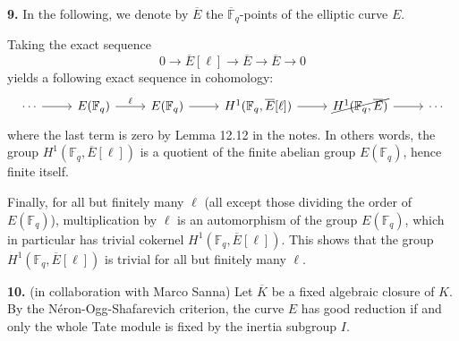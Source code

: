 \documentclass[a4paper]{article}
\newcommand{\Fq}{\mathbb{F}_q}
\newcommand{\Fqq}{\overline{\mathbb{F}}_q}
\newcommand{\E}{\overline{E}}
\theoremstyle{definition}
\theoremstyle{definition}
\theoremstyle{remark}
\theoremstyle{definition}
\begin{document}
\textbf{9.} In the following, we denote by $\E$ the $\Fqq$-points of the elliptic curve $E$.

\noindent Taking the exact sequence
\begin{equation*}
        0 \to \E[\ell] \to \E \to \E \to 0
\end{equation*}
yields a following exact sequence in cohomology:
\[
        \begin{tikzcd}
                \cdots \ar[r] & E(\Fq) \ar[r, "\ell"] &E(\Fq) \ar[r] &H^1(\Fq, \E[\ell]) \ar[r] &\cancel{H^1(\Fq, \E)} \ar[r] &\cdots
        \end{tikzcd}
\]
where the last term is zero by Lemma 12.12 in the notes. In others words, the group $H^1(\Fq, \E[\ell])$ is a quotient of the finite abelian group $E(\Fq)$, hence finite itself.

Finally, for all but finitely many $\ell$ (all except those dividing the order of $E(\Fq)$), multiplication by $\ell$ is an automorphism of the group $E(\Fq)$, which in particular has trivial cokernel $H^1(\Fq, \E[\ell])$. This shows that the group $H^1(\Fq, \E[\ell])$ is trivial for all but finitely many $\ell$.

\textbf{10.} (in collaboration with Marco Sanna)
\noindent Let $\overline{K}$ be a fixed algebraic closure of $K$. By the N\'eron-Ogg-Shafarevich criterion, the curve $E$ has good reduction if and only the whole Tate module is
fixed by the inertia subgroup $I$.
\end{document}
